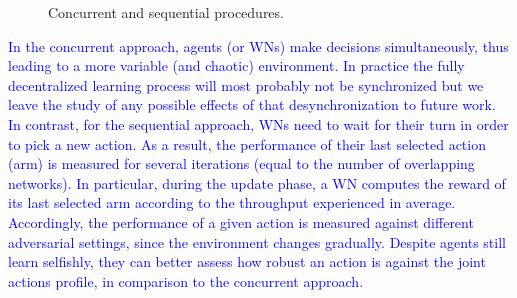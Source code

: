 \documentclass[preprint,12pt]{elsarticle}
\begin{document}
	\begin{figure}[h!]
		\centering				
		\caption{Concurrent and sequential procedures.}
		\label{fig:async_vs_sync}
	\end{figure}
	
	\textcolor{blue}{In the concurrent approach, agents (or WNs) make decisions simultaneously, thus leading to a more variable (and chaotic) environment. In practice the fully decentralized learning process will most probably not be synchronized but we leave the study of any possible effects of that desynchronization to future work. In contrast, \textcolor{blue}{for the sequential approach, WNs need to wait for their turn in order to pick a new action. As a result, the performance of their last selected action (arm) is measured for several iterations (equal to the number of overlapping networks). In particular, during the update phase, a WN computes the reward of its last selected arm according to the throughput experienced in average. Accordingly, the performance of a given action is measured against different adversarial settings, since the environment changes gradually. Despite agents still learn selfishly, they can better assess how robust an action is against the joint actions profile, in comparison to the concurrent approach.}} 
	
\end{document}

